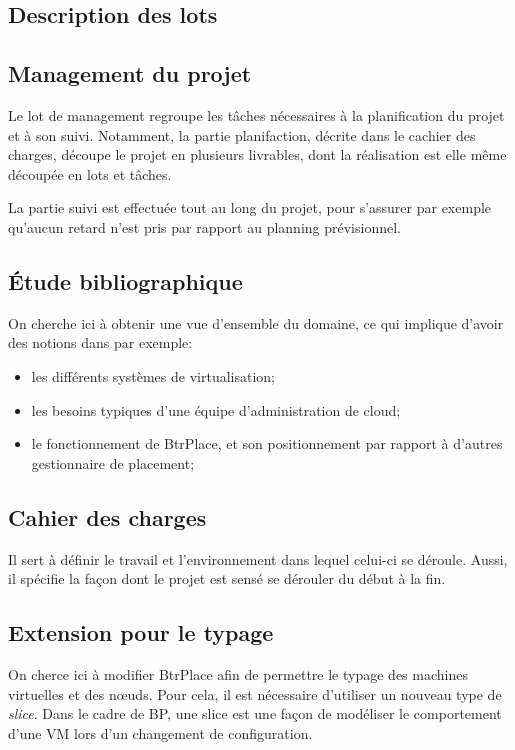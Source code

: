 \documentclass[a4paper]{article}
\begin{document}
\subsection{Description des lots}
\subsection{  Management du projet  }
Le lot de management regroupe les tâches nécessaires à la planification du
projet et à son suivi. Notamment, la partie planifaction, décrite dans le
cachier des charges, découpe le projet en plusieurs livrables,
dont la réalisation est elle même découpée en lots et tâches.

La partie suivi est effectuée tout au long du projet, pour s'assurer par
exemple qu'aucun retard n'est pris par rapport au planning prévisionnel.

\subsection{  Étude bibliographique  }
On cherche ici à obtenir une vue d'ensemble du domaine, ce qui implique
d'avoir des notions dans par exemple:
\begin{itemize}
	\item les différents systèmes de virtualisation;
	\item les besoins typiques d'une équipe d'administration de cloud;
	\item le fonctionnement de BtrPlace, et son positionnement par rapport
		à d'autres gestionnaire de placement;
\end{itemize}
\subsection{  Cahier des charges  }
Il sert à définir le travail et l'environnement dans lequel celui-ci
se déroule. Aussi, il spécifie la façon dont le projet est sensé se dérouler
du début à la fin.

\subsection{  Extension pour le typage  }
On cherce ici à modifier BtrPlace afin de permettre le typage
des machines virtuelles et des nœuds. Pour cela, il est nécessaire d'utiliser un
nouveau type de \textit{slice}. Dans le cadre de BP, une slice est une façon
de modéliser le comportement d'une VM lors d'un changement de configuration.
\end{document}
